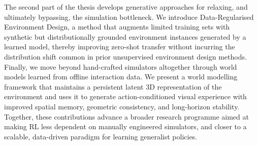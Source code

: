 {The second part of the thesis develops generative approaches for relaxing, and ultimately bypassing, the simulation bottleneck. We introduce Data-Regularised Environment Design, a method that augments limited training sets with synthetic but distributionally grounded environment instances generated by a learned model, thereby improving zero-shot transfer without incurring the distribution shift common in prior unsupervised environment design methods. Finally, we move beyond hand-crafted simulators altogether through world models learned from offline interaction data. We present a world modelling framework that maintains a persistent latent 3D representation of the environment and uses it to generate action-conditioned visual experience with improved spatial memory, geometric consistency, and long-horizon stability. Together, these contributions advance a broader research programme aimed at making RL less dependent on manually engineered simulators, and closer to a scalable, data-driven paradigm for learning generalist policies.
}


